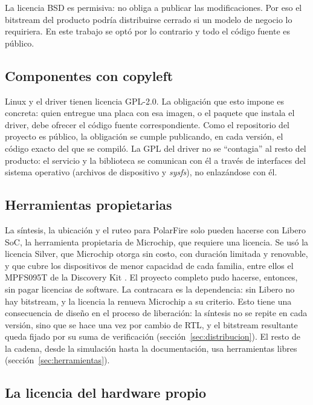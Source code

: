 La licencia BSD es permisiva: no obliga a publicar las modificaciones. Por
eso el bitstream del producto podría distribuirse cerrado si un modelo de
negocio lo requiriera. En este trabajo se optó por lo contrario y todo el
código fuente es público.

\subsection{Componentes con copyleft}

Linux y el driver tienen licencia GPL-2.0. La obligación que esto impone es
concreta: quien entregue una placa con esa imagen, o el paquete que instala
el driver, debe ofrecer el código fuente correspondiente. Como el repositorio
del proyecto es público, la obligación se cumple publicando, en cada
versión, el código exacto del que se compiló. La GPL del driver no se
\enquote{contagia} al resto del producto: el servicio y la biblioteca se
comunican con él a través de interfaces del sistema operativo (archivos de
dispositivo y \emph{sysfs}), no enlazándose con él.

\subsection{Herramientas propietarias}

La síntesis, la ubicación y el ruteo para PolarFire solo pueden hacerse con
Libero SoC, la herramienta propietaria de Microchip, que requiere una
licencia. Se usó la licencia Silver, que Microchip otorga sin costo, con
duración limitada y renovable, y que cubre los dispositivos de menor
capacidad de cada familia, entre ellos el MPFS095T de la Discovery Kit
\citep{Microchip_licensing}. El proyecto completo pudo hacerse, entonces, sin
pagar licencias de software. La contracara es la dependencia: sin Libero no
hay bitstream, y la licencia la renueva Microchip a su criterio. Esto
tiene una consecuencia de diseño en el proceso de liberación: la síntesis no
se repite en cada versión, sino que se hace una vez por cambio de RTL, y el
bitstream resultante queda fijado por su suma de verificación
(sección~\ref{sec:distribucion}). El resto de la cadena, desde la simulación
hasta la documentación, usa herramientas libres
(sección~\ref{sec:herramientas}).

\subsection{La licencia del hardware propio}
\label{sec:licencia-propia}

